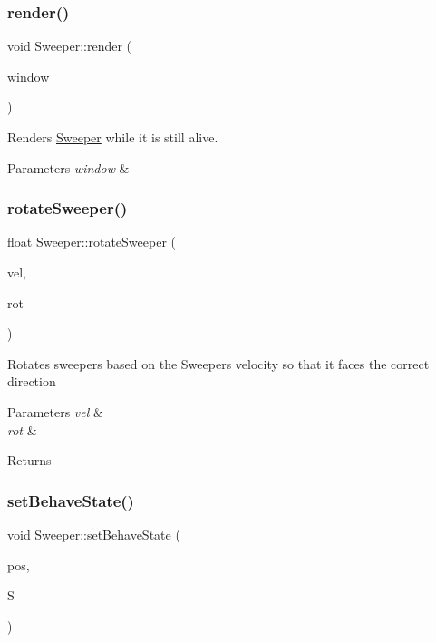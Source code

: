 \subsubsection{\texorpdfstring{render()}{render()}}
{\footnotesize\ttfamily void Sweeper\+::render (\begin{DoxyParamCaption}\item[{sf\+::\+Render\+Window \&}]{window }\end{DoxyParamCaption})}



Renders \mbox{\hyperlink{class_sweeper}{Sweeper}} while it is still alive. 


\begin{DoxyParams}{Parameters}
{\em window} & \\
\hline
\end{DoxyParams}
\mbox{\label{class_sweeper_af1af1e14967e47526c530963b93fcea9}} 
\subsubsection{\texorpdfstring{rotateSweeper()}{rotateSweeper()}}
{\footnotesize\ttfamily float Sweeper\+::rotate\+Sweeper (\begin{DoxyParamCaption}\item[{sf\+::\+Vector2f}]{vel,  }\item[{float}]{rot }\end{DoxyParamCaption})\hspace{0.3cm}{\ttfamily [private]}}



Rotates sweepers based on the Sweepers velocity so that it faces the correct direction 


\begin{DoxyParams}{Parameters}
{\em vel} & \\
\hline
{\em rot} & \\
\hline
\end{DoxyParams}
\begin{DoxyReturn}{Returns}

\end{DoxyReturn}
\mbox{\label{class_sweeper_a557be93dd6ee042a2b7323350c244ae4}} 
\subsubsection{\texorpdfstring{setBehaveState()}{setBehaveState()}}
{\footnotesize\ttfamily void Sweeper\+::set\+Behave\+State (\begin{DoxyParamCaption}\item[{sf\+::\+Vector2f}]{pos,  }\item[{behave\+State}]{S }\end{DoxyParamCaption})}



